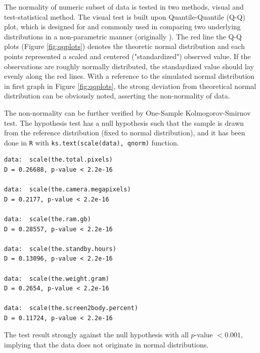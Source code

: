 \documentclass[utf8,english]{gradu3}
\begin{document}
The normality of numeric subset of data is tested in two methods, visual and test-statistical method. The visual test is built upon Quantile-Quantile (Q-Q) plot, which is designed for and commonly used in comparing two underlying distributions in a non-parametric manner (originally \cite{wilk1968probability}). The red line the Q-Q plots (Figure \ref{fig:qqplots}) denotes the theoretic normal distribution and each points represented a scaled and centered ("standardized") observed value. If the observations are roughly normally distributed, the standardized value should lay evenly along the red lines. With a reference to the simulated normal distribution in first graph in Figure \ref{fig:qqplots}, the strong deviation from theoretical normal distribution can be obviously noted, asserting the non-normality of data.

The non-normality can be further verified by One-Sample Kolmogorov-Smirnov test. The hypothesis test has a null hypothesis such that the sample is drawn from the reference distribution (fixed to normal distribution), and it has been done in \texttt{R} with \texttt{ks.text(scale(data), qnorm)} function. 

\begin{verbatim}
data:  scale(the.total.pixels)
D = 0.26688, p-value < 2.2e-16

data:  scale(the.camera.megapixels)
D = 0.2177, p-value < 2.2e-16

data:  scale(the.ram.gb)
D = 0.28557, p-value < 2.2e-16

data:  scale(the.standby.hours)
D = 0.13096, p-value < 2.2e-16

data:  scale(the.weight.gram)
D = 0.2654, p-value < 2.2e-16

data:  scale(the.screen2body.percent)
D = 0.11724, p-value < 2.2e-16
\end{verbatim}

The test result strongly against the null hypothesis with all $p$-value $< 0.001$, implying that the data does not originate in normal distributions.
\end{document}
